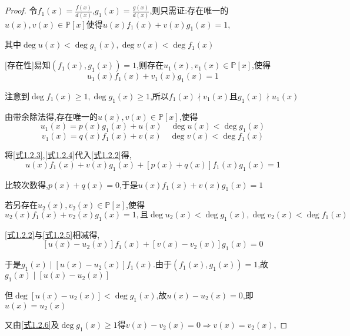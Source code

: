 \begin{proof}
    
    令$f_1(x)=\frac{f(x)}{d(x)}$,$g_1(x)=\frac{g(x)}{d(x)}$,则只需证:存在唯一的$u(x),v(x)\in \mathbb{P}[x]$使得$u(x)f_1(x)+v(x)g_1(x)=1$,
    
    其中$\deg u(x)<\deg g_1(x),\deg v(x)<\deg f_1(x)$ 

    [存在性]易知$(f_1(x),g_1(x))=1$,则存在$u_1(x),v_1(x)\in \mathbb{P}[x]$,使得
    \begin{equation}\label{式1.2.2}
        u_1(x)f_1(x)+v_1(x)g_1(x)=1
    \end{equation}

    注意到$\deg f_1(x)\ge 1,\deg g_1(x)\ge 1$,所以$f_1(x)\nmid v_1(x)$且$g_1(x)\nmid u_1(x)$

    由带余除法得,存在唯一的$u(x),v(x)\in \mathbb{P}[x]$,使得
    \begin{equation}\label{式1.2.3}
        u_1(x)=p(x)g_1(x)+u(x) \quad \deg u(x) < \deg g_1(x)
    \end{equation}
    \begin{equation}\label{式1.2.4}
        v_1(x)=q(x)f_1(x)+v(x) \quad \deg v(x) < \deg f_1(x)
    \end{equation}

    将\cref{式1.2.3},\cref{式1.2.4}代入\cref{式1.2.2}得,
    $$u(x)f_1(x)+v(x)g_1(x)+[p(x)+q(x)]f_1(x)g_1(x)=1$$

    比较次数得,$p(x)+q(x)=0$,于是$u(x)f_1(x)+v(x)g_1(x)=1$

    \clearpage
    [唯一性]若另存在$u_2(x),v_2(x)\in \mathbb{P}[x]$,使得
    \begin{equation}\label{式1.2.5}
        u_2(x)f_1(x)+v_2(x)g_1(x)=1,\mbox{且}
        \deg u_2(x)<\deg g_1(x),\deg v_2(x)<\deg f_1(x)
    \end{equation}

    \cref{式1.2.2}与\cref{式1.2.5}相减得,
    \begin{equation}\label{式1.2.6}
        [u(x)-u_2(x)]f_1(x)+[v(x)-v_2(x)]g_1(x)=0
    \end{equation}

    于是$g_1(x)\mid [u(x)-u_2(x)]f_1(x)$.由于$(f_1(x),g_1(x))=1$,故$g_1(x)\mid [u(x)-u_2(x)]$

    但$\deg [u(x)-u_2(x)]<\deg g_1(x)$,故$u(x)-u_2(x)=0$,即$u(x)=u_2(x)$

    又由\cref{式1.2.6}及$\deg g_1(x)\ge 1$得$v(x)-v_2(x)=0\Longrightarrow v(x)=v_2(x)$,
\end{proof}

